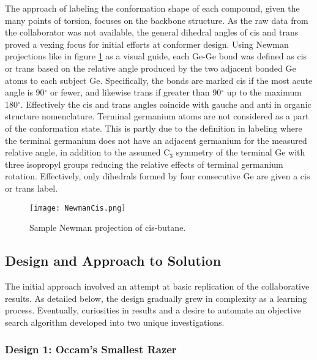 The approach of labeling the conformation shape of each compound, given the many points of torsion, focuses on the backbone structure. 
As the raw data from the collaborator was not available, the general dihedral angles of cis and trans proved a vexing focus for initial efforts at conformer design.
Using Newman projections like in figure \ref{fig:Newman} as a visual guide, each Ge-Ge bond was defined as cis or trans based on the relative angle produced by the two  adjacent bonded Ge atoms to each subject Ge.
Specifically, the bonds are marked cis if the most acute angle is 90$^{\circ}$ or fewer, and likewise trans if greater than 90$^{\circ}$ up to the maximum 180$^{\circ}$.
Effectively the cis and trans angles coincide with gauche and anti in organic structure nomenclature.
Terminal germanium atoms are not considered as a part of the conformation state. 
This is partly due to the definition in labeling where the terminal germanium does not have an adjacent germanium for the measured relative angle, in addition to the assumed 
C$_{3}$
symmetry of the terminal Ge with three isopropyl groups reducing the relative effects of terminal germanium rotation.
Effectively, only dihedrals formed by four consecutive Ge are given a cis or trans label.

\begin{figure}
	
	\centering
	
	\texttt{[image: NewmanCis.png]}
	
	\caption{Sample Newman projection of cis-butane.}
	
	\label{fig:Newman}
	
\end{figure}

\subsection{Design and Approach to Solution}

The initial approach involved an attempt at basic replication of the collaborative results.
As detailed below, the design gradually grew in complexity as a learning process. 
Eventually, curiosities in results and a desire to automate an objective search algorithm developed into two unique investigations.

\subsubsection{Design 1: Occam's Smallest Razer}

